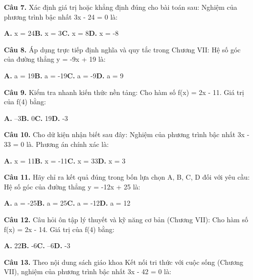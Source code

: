 \documentclass[11pt,a4paper]{article}
\begin{document}
\textbf{\color{primary} Câu 7.} Xác định giá trị hoặc khẳng định đúng cho bài toán sau: Nghiệm của phương trình bậc nhất 3x - 24 = 0 là:\par
\hspace*{1.5em}\textbf{A.} x = 24\quad\quad \textbf{B.} x = 3\quad\quad \textbf{C.} x = 8\quad\quad \textbf{D.} x = -8\par\vspace{2pt}
\textbf{\color{primary} Câu 8.} Áp dụng trực tiếp định nghĩa và quy tắc trong Chương VII: Hệ số góc của đường thẳng y = -9x + 19 là:\par
\hspace*{1.5em}\textbf{A.} a = 19\quad\quad \textbf{B.} a = -19\quad\quad \textbf{C.} a = -9\quad\quad \textbf{D.} a = 9\par\vspace{2pt}
\textbf{\color{primary} Câu 9.} Kiểm tra nhanh kiến thức nền tảng: Cho hàm số f(x) = 2x - 11. Giá trị của f(4) bằng:\par
\hspace*{1.5em}\textbf{A.} --3\quad\quad \textbf{B.} 0\quad\quad \textbf{C.} 19\quad\quad \textbf{D.} -3\par\vspace{2pt}
\textbf{\color{primary} Câu 10.} Cho dữ kiện nhận biết sau đây: Nghiệm của phương trình bậc nhất 3x - 33 = 0 là. Phương án chính xác là:\par
\hspace*{1.5em}\textbf{A.} x = 11\quad\quad \textbf{B.} x = -11\quad\quad \textbf{C.} x = 33\quad\quad \textbf{D.} x = 3\par\vspace{2pt}
\textbf{\color{primary} Câu 11.} Hãy chỉ ra kết quả đúng trong bốn lựa chọn A, B, C, D đối với yêu cầu: Hệ số góc của đường thẳng y = -12x + 25 là:\par
\hspace*{1.5em}\textbf{A.} a = -25\quad\quad \textbf{B.} a = 25\quad\quad \textbf{C.} a = -12\quad\quad \textbf{D.} a = 12\par\vspace{2pt}
\textbf{\color{primary} Câu 12.} Câu hỏi ôn tập lý thuyết và kỹ năng cơ bản (Chương VII): Cho hàm số f(x) = 2x - 14. Giá trị của f(4) bằng:\par
\hspace*{1.5em}\textbf{A.} 22\quad\quad \textbf{B.} -6\quad\quad \textbf{C.} --6\quad\quad \textbf{D.} -3\par\vspace{2pt}
\textbf{\color{primary} Câu 13.} Theo nội dung sách giáo khoa Kết nối tri thức với cuộc sống (Chương VII), nghiệm của phương trình bậc nhất 3x - 42 = 0 là:\par
\end{document}
